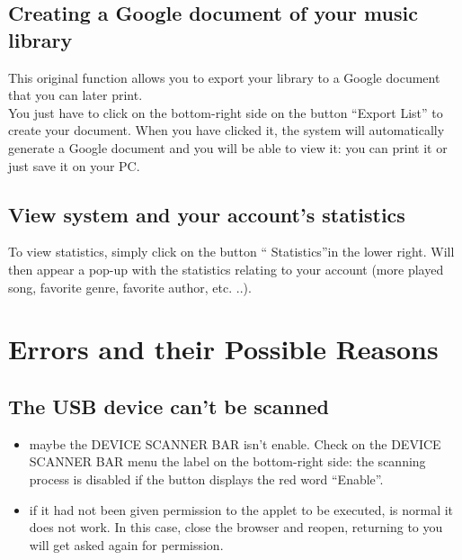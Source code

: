 \subsection{Creating a Google document of your music library}

This original function allows you to export your library to a Google document
that you can later print.\\
You just have to click on the bottom-right side on the button ``Export List''
to create your document. When you have clicked it, the system will automatically
generate a Google document and you will be able to view it: you can print it or
just save it on your PC.

\subsection{View system and your account's statistics}

To view statistics, simply click on the button
`` Statistics''in the lower right. Will then appear a pop-up with the
statistics relating to your account
(more played song, favorite genre, favorite author, etc. ..).

\newpage
\section{Errors and their Possible Reasons}

\subsection*{The USB device can't be scanned}
\begin{itemize}
  \item maybe the DEVICE SCANNER BAR isn't enable. Check on the DEVICE SCANNER
  BAR menu the label on the bottom-right side: the scanning process is disabled
  if the button displays the red word ``Enable''.
  \item if it had not been given permission to the applet to be executed, is
   normal it does not work. In this case, close the browser and
   reopen, returning to  you will get asked again for permission.
\end{itemize}

